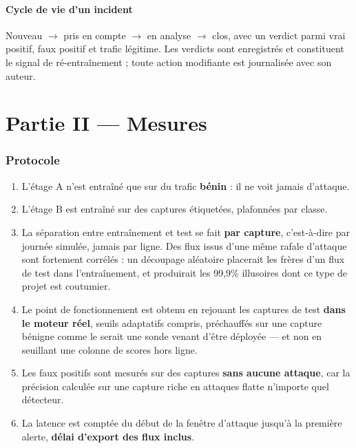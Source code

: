 \documentclass[11pt,a4paper]{article}
\begin{document}
\subsection{Cycle de vie d'un incident}

Nouveau $\rightarrow$ pris en compte $\rightarrow$ en analyse $\rightarrow$ clos, avec un verdict
parmi \og{}vrai positif\fg{}, \og{}faux positif\fg{} et \og{}trafic légitime\fg{}. Les verdicts sont
enregistrés et constituent le signal de ré-entraînement ; toute action modifiante est journalisée
avec son auteur.

\clearpage
\part*{Partie II --- Mesures}

\section{Protocole}

\begin{enumerate}
\item L'étage A n'est entraîné que sur du trafic \textbf{bénin} : il ne voit jamais d'attaque.
\item L'étage B est entraîné sur des captures étiquetées, plafonnées par classe.
\item La séparation entre entraînement et test se fait \textbf{par capture}, c'est-à-dire par
\og{}journée simulée\fg{}, jamais par ligne. Des flux issus d'une même rafale d'attaque sont
fortement corrélés : un découpage aléatoire placerait les frères d'un flux de test dans
l'entraînement, et produirait les 99,9\% illusoires dont ce type de projet est coutumier.
\item Le point de fonctionnement est obtenu en rejouant les captures de test \textbf{dans le moteur
réel}, seuils adaptatifs compris, préchauffés sur une capture bénigne comme le serait une sonde
venant d'être déployée --- et non en seuillant une colonne de scores hors ligne.
\item Les faux positifs sont mesurés sur des captures \textbf{sans aucune attaque}, car la précision
calculée sur une capture riche en attaques flatte n'importe quel détecteur.
\item La latence est comptée du début de la fenêtre d'attaque jusqu'à la première alerte,
\textbf{délai d'export des flux inclus}.
\end{enumerate}
\end{document}
